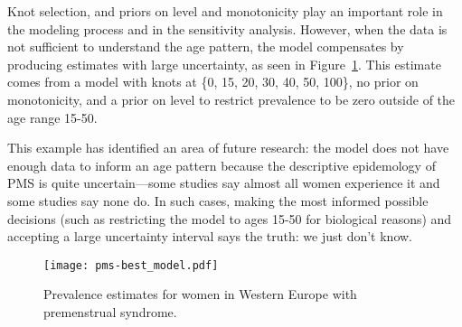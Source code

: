 Knot selection, and priors on level and monotonicity play an important
role in the modeling process and in the sensitivity analysis.
However, when the data is not sufficient to understand the age
pattern, the model compensates by producing estimates with large
uncertainty, as seen in Figure~\ref{fig:app-pms best}.  This estimate
comes from a model with knots at \{0, 15, 20, 30, 40, 50, 100\}, no
prior on monotonicity, and a prior on level to restrict prevalence to
be zero outside of the age range 15-50.

This example has identified an area of future research: the model does
not have enough data to inform an age pattern because the descriptive
epidemology of PMS is quite uncertain---some studies say almost all women
experience it and some studies say none do.  In such cases, making the
most informed possible decisions (such as restricting the model to
ages 15-50 for biological reasons) and accepting a large uncertainty
interval says the truth: we just don't know.

    \begin{figure}
        \begin{center}
            \texttt{[image: pms-best\_model.pdf]}
        \end{center}
        \caption{Prevalence estimates for women
          in Western Europe with premenstrual syndrome.}
        \label{fig:app-pms best}
    \end{figure}









